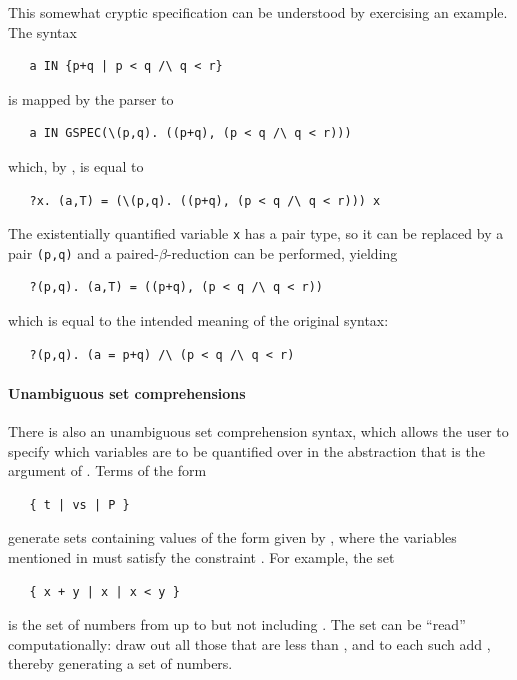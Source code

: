 This somewhat cryptic specification can be understood by exercising an
example. The syntax
%
\begin{hol}
\begin{verbatim}
   a IN {p+q | p < q /\ q < r}
\end{verbatim}
\end{hol}
%
is mapped by the \HOL{} parser to
\begin{hol}
\begin{verbatim}
   a IN GSPEC(\(p,q). ((p+q), (p < q /\ q < r)))
\end{verbatim}
\end{hol}
%
which, by , is equal to
\begin{hol}
\begin{verbatim}
   ?x. (a,T) = (\(p,q). ((p+q), (p < q /\ q < r))) x
\end{verbatim}
\end{hol}
%
The existentially quantified variable \verb+x+ has a pair type,
so it can be replaced by a pair \verb+(p,q)+ and a
paired-$\beta$-reduction can be performed, yielding
%
\begin{hol}
\begin{verbatim}
   ?(p,q). (a,T) = ((p+q), (p < q /\ q < r))
\end{verbatim}
\end{hol}
%
which is equal to the intended meaning of the original
syntax:
%
\begin{hol}
\begin{verbatim}
   ?(p,q). (a = p+q) /\ (p < q /\ q < r)
\end{verbatim}
\end{hol}

\paragraph{Unambiguous set comprehensions} There is also
an unambiguous set comprehension syntax, which allows the user to
specify which variables are to be quantified over in the abstraction
that is the argument of .  Terms of the form
\begin{hol}
\begin{verbatim}
   { t | vs | P }
\end{verbatim}
\end{hol}
generate sets containing values of the form given by , where
the variables mentioned in  must satisfy the constraint
.  For example, the set
\begin{hol}
\begin{verbatim}
   { x + y | x | x < y }
\end{verbatim}
\end{hol}
is the set of numbers from  up to but not including
.  The set can be ``read'' computationally: draw out all
those  that are less than , and to each such
 add , thereby generating a set of numbers.

